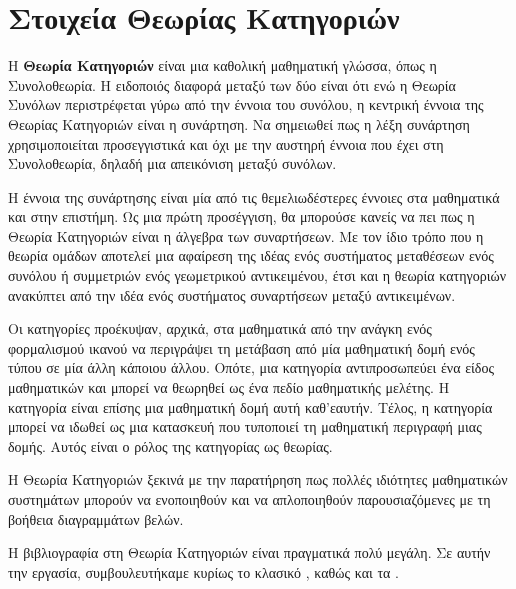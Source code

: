 \documentclass [a4paper,11pt] {book}
\theoremstyle{definition}
\theoremstyle{definition}
\newenvironment{note}[1][Σημείωση]{\begin{trivlist}
\item[\hskip \labelsep {\bfseries #1}]}{\end{trivlist}}
\begin{document}
\endgroup

\chapter{Στοιχεία Θεωρίας Κατηγοριών}
Η \textbf{Θεωρία Κατηγοριών} είναι μια καθολική μαθηματική γλώσσα, όπως η Συνολοθεωρία. Η ειδοποιός διαφορά μεταξύ των δύο είναι ότι ενώ η Θεωρία Συνόλων περιστρέφεται γύρω από την έννοια του συνόλου, η κεντρική έννοια της Θεωρίας Κατηγοριών είναι η συνάρτηση. Να σημειωθεί πως η λέξη συνάρτηση χρησιμοποιείται προσεγγιστικά και όχι με την αυστηρή έννοια που έχει στη Συνολοθεωρία, δηλαδή μια απεικόνιση μεταξύ συνόλων.

Η έννοια της συνάρτησης είναι μία από τις θεμελιωδέστερες έννοιες στα μαθηματικά και στην επιστήμη. Ως μια πρώτη προσέγγιση, θα μπορούσε κανείς να πει πως η Θεωρία Κατηγοριών είναι η άλγεβρα των συναρτήσεων. Με τον ίδιο τρόπο που η θεωρία ομάδων αποτελεί μια αφαίρεση της ιδέας ενός συστήματος μεταθέσεων ενός συνόλου ή συμμετριών ενός γεωμετρικού αντικειμένου, έτσι και η θεωρία κατηγοριών ανακύπτει από την ιδέα ενός συστήματος συναρτήσεων μεταξύ αντικειμένων.

Οι κατηγορίες προέκυψαν, αρχικά, στα μαθηματικά από την ανάγκη ενός φορμαλισμού ικανού να περιγράψει τη μετάβαση από μία μαθηματική δομή ενός τύπου σε μία άλλη κάποιου άλλου. Οπότε, μια κατηγορία αντιπροσωπεύει ένα είδος μαθηματικών και μπορεί να θεωρηθεί ως ένα πεδίο μαθηματικής μελέτης. Η κατηγορία είναι επίσης μια μαθηματική δομή αυτή καθ'εαυτήν. Τέλος, η κατηγορία μπορεί να ιδωθεί ως μια κατασκευή που τυποποιεί τη μαθηματική περιγραφή μιας δομής. Αυτός είναι ο ρόλος της κατηγορίας ως θεωρίας.

Η Θεωρία Κατηγοριών ξεκινά με την παρατήρηση πως πολλές ιδιότητες μαθηματικών συστημάτων μπορούν να ενοποιηθούν και να απλοποιηθούν παρουσιαζόμενες με τη βοήθεια διαγραμμάτων βελών.

\begin{note}
Η βιβλιογραφία στη Θεωρία Κατηγοριών είναι πραγματικά πολύ μεγάλη. Σε αυτήν την εργασία, συμβουλευτήκαμε κυρίως το κλασικό \cite{lane1998categories}, καθώς και τα  \citep{PIERCE91}\citep{awodey2006category}\citep{van1995basic}.
\end{note}
\end{document}
